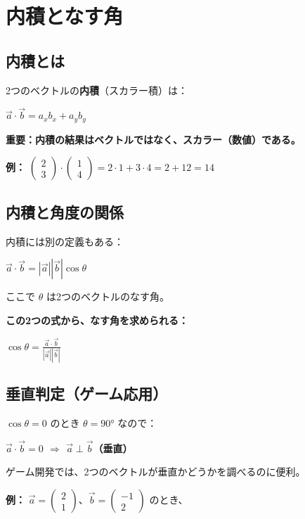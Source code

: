 \documentclass[paper=a4,fleqn]{jlreq}
\newcommand{\formula}[1]{%
  \vspace{4pt}%
  \begin{center}{\large\bfseries\boldmath\(\displaystyle #1\)}\end{center}%
  \vspace{4pt}%
}
\begin{document}
\section{内積となす角}

\subsection{内積とは}

2つのベクトルの\textbf{内積}（スカラー積）は：

\formula{\vec{a} \cdot \vec{b} = a_x b_x + a_y b_y}

\textbf{重要：内積の結果はベクトルではなく、スカラー（数値）である。}

\textbf{例：} \(\begin{pmatrix} 2 \\ 3 \end{pmatrix} \cdot \begin{pmatrix} 1 \\ 4 \end{pmatrix} = 2 \cdot 1 + 3 \cdot 4 = 2 + 12 = 14\)

\subsection{内積と角度の関係}

内積には別の定義もある：

\formula{\vec{a} \cdot \vec{b} = |\vec{a}||\vec{b}|\cos\theta}

ここで \(\theta\) は2つのベクトルのなす角。

\textbf{この2つの式から、なす角を求められる：}

\formula{\cos\theta = \frac{\vec{a} \cdot \vec{b}}{|\vec{a}||\vec{b}|}}

\subsection{垂直判定（ゲーム応用）}

\(\cos\theta = 0\) のとき \(\theta = 90°\) なので：

\textbf{\(\vec{a} \cdot \vec{b} = 0\) \(\Rightarrow\) \(\vec{a} \perp \vec{b}\)（垂直）}

ゲーム開発では、2つのベクトルが垂直かどうかを調べるのに便利。

\textbf{例：} \(\vec{a} = \begin{pmatrix} 2 \\ 1 \end{pmatrix}\)、\(\vec{b} = \begin{pmatrix} -1 \\ 2 \end{pmatrix}\) のとき、
\end{document}
